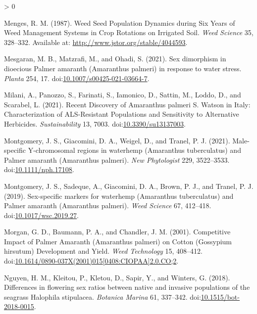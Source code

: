 \documentclass[utf8]{frontiersSCNS}
\newlength{\cslhangindent}
\newenvironment{CSLReferences}[2] %
 {%
  \setlength{\parindent}{0pt}
  \ifodd #1 \everypar{\setlength{\hangindent}{\cslhangindent}}\ignorespaces\fi
  \ifnum #2 > 0
  \setlength{\parskip}{#2\baselineskip}
  \fi
 }%
 {}
\begin{document}
\begin{CSLReferences}{1}{0}
\leavevmode\hypertarget{ref-menges1987}{}%
Menges, R. M. (1987). Weed {Seed Population Dynamics} during {Six Years}
of {Weed Management Systems} in {Crop Rotations} on {Irrigated Soil}.
\emph{Weed Science} 35, 328--332. Available at:
\url{http://www.jstor.org/stable/4044593}.

\leavevmode\hypertarget{ref-mesgaran2021}{}%
Mesgaran, M. B., Matzrafi, M., and Ohadi, S. (2021). Sex dimorphism in
dioecious {Palmer} amaranth ({Amaranthus} palmeri) in response to water
stress. \emph{Planta} 254, 17.
doi:\href{https://doi.org/10.1007/s00425-021-03664-7}{10.1007/s00425-021-03664-7}.

\leavevmode\hypertarget{ref-milani2021}{}%
Milani, A., Panozzo, S., Farinati, S., Iamonico, D., Sattin, M., Loddo,
D., and Scarabel, L. (2021). Recent {Discovery} of {Amaranthus} palmeri
{S}. {Watson} in {Italy}: {Characterization} of {ALS}-{Resistant
Populations} and {Sensitivity} to {Alternative Herbicides}.
\emph{Sustainability} 13, 7003.
doi:\href{https://doi.org/10.3390/su13137003}{10.3390/su13137003}.

\leavevmode\hypertarget{ref-montgomery2021}{}%
Montgomery, J. S., Giacomini, D. A., Weigel, D., and Tranel, P. J.
(2021). Male-specific {Y}-chromosomal regions in waterhemp ({Amaranthus}
tuberculatus) and {Palmer} amaranth ({Amaranthus} palmeri). \emph{New
Phytologist} 229, 3522--3533.
doi:\href{https://doi.org/10.1111/nph.17108}{10.1111/nph.17108}.

\leavevmode\hypertarget{ref-montgomery2019}{}%
Montgomery, J. S., Sadeque, A., Giacomini, D. A., Brown, P. J., and
Tranel, P. J. (2019). Sex-specific markers for waterhemp ({Amaranthus}
tuberculatus) and {Palmer} amaranth ({Amaranthus} palmeri). \emph{Weed
Science} 67, 412--418.
doi:\href{https://doi.org/10.1017/wsc.2019.27}{10.1017/wsc.2019.27}.

\leavevmode\hypertarget{ref-morgan2001}{}%
Morgan, G. D., Baumann, P. A., and Chandler, J. M. (2001). Competitive
{Impact} of {Palmer Amaranth} ({Amaranthus} palmeri) on {Cotton}
({Gossypium} hirsutum) {Development} and {Yield}. \emph{Weed Technology}
15, 408--412.
doi:\href{https://doi.org/10.1614/0890-037X(2001)015\%5B0408:CIOPAA\%5D2.0.CO;2}{10.1614/0890-037X(2001)015{[}0408:CIOPAA{]}2.0.CO;2}.

\leavevmode\hypertarget{ref-nguyen2018}{}%
Nguyen, H. M., Kleitou, P., Kletou, D., Sapir, Y., and Winters, G.
(2018). Differences in flowering sex ratios between native and invasive
populations of the seagrass {Halophila} stipulacea. \emph{Botanica
Marina} 61, 337--342.
doi:\href{https://doi.org/10.1515/bot-2018-0015}{10.1515/bot-2018-0015}.


\end{CSLReferences}
\end{document}
